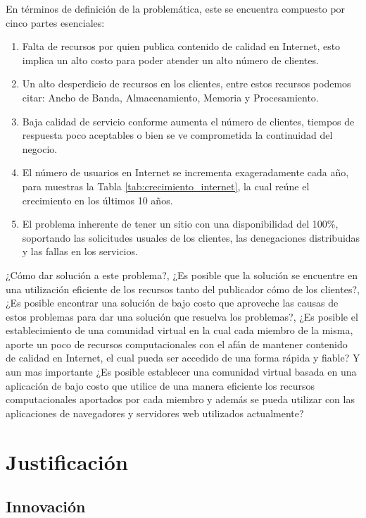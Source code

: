 En términos de definición de la problemática, este se encuentra compuesto por cinco partes esenciales:
\begin{enumerate}
\item Falta de recursos por quien publica contenido de calidad en Internet, esto implica un alto costo para poder atender un alto número de clientes.
\item Un alto desperdicio de recursos en los clientes, entre estos recursos podemos citar: Ancho de Banda, Almacenamiento, Memoria y Procesamiento.
\item Baja calidad de servicio conforme aumenta el número de clientes, tiempos de respuesta poco aceptables o bien se ve comprometida la continuidad del negocio. 
\item El número de usuarios en Internet se incrementa exageradamente cada año, para muestras la Tabla \ref{tab:crecimiento_internet}, la cual reúne el crecimiento en los últimos 10 años.
\item El problema inherente de tener un sitio con una disponibilidad del 100\%, soportando las solicitudes usuales de los clientes, las denegaciones distribuidas y las fallas en los servicios. 
\end{enumerate}

¿Cómo dar solución a este problema?, ¿Es posible que la solución se encuentre en una utilización eficiente de los recursos tanto del publicador cómo de los clientes?, ¿Es posible encontrar una solución de bajo costo que aproveche las causas de estos problemas para dar una solución que resuelva los problemas?, ¿Es posible el establecimiento de una comunidad virtual en la cual cada miembro de la misma, aporte un poco de recursos computacionales con el afán de mantener contenido de calidad en Internet, el cual pueda ser accedido de una forma rápida y fiable? Y aun mas importante ¿Es posible establecer una comunidad virtual basada en una aplicación de bajo costo que utilice de una manera eficiente los recursos computacionales aportados por cada miembro y además se pueda utilizar con las aplicaciones de navegadores y servidores web utilizados actualmente?

\section{Justificación}

\subsection{Innovación}

